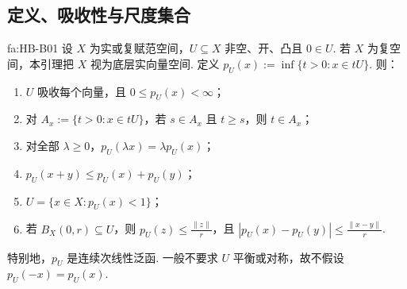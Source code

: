 \subsection{定义、吸收性与尺度集合}

\begin{FALemma}[B][Minkowski泛函支撑结果]{fa:HB-B01}
设 \(\displaystyle X\) 为实或复赋范空间，\(\displaystyle U\subseteq X\) 非空、开、凸且 \(\displaystyle0\in U\). 若 \(\displaystyle X\) 为复空间，本引理把 \(\displaystyle X\) 视为底层实向量空间. 定义 \(\displaystyle p_U(x) :=\inf\{t>0:x\in tU\}\).
则：
\begin{enumerate}[label=\textnormal{(\roman*)}]
\item \(\displaystyle U\) 吸收每个向量，且 \(\displaystyle0\leqslant p_U(x)<\infty\)；
\item 对 \(\displaystyle A_x:=\{t>0:x\in tU\}\)，若 \(\displaystyle s\in A_x\) 且 \(\displaystyle t\geqslant s\)，则 \(\displaystyle t\in A_x\)；
\item 对全部 \(\displaystyle \lambda\geqslant0\)，\(\displaystyle p_U(\lambda x)=\lambda p_U(x)\)；
\item \(\displaystyle p_U(x+y)\leqslant p_U(x)+p_U(y)\)；
\item \(\displaystyle U=\{x\in X:p_U(x)<1\}\)；
\item 若 \(\displaystyle B_X(0,r)\subseteq U\)，则 \(\displaystyle p_U(z)\leqslant\frac{\|z\|}{r}\)，且 \(\displaystyle |p_U(x)-p_U(y)|\leqslant\frac{\|x-y\|}{r}\).
\end{enumerate}
特别地，\(\displaystyle p_U\) 是连续次线性泛函. 一般不要求 \(\displaystyle U\) 平衡或对称，故不假设 \(\displaystyle p_U(-x)=p_U(x)\).
\end{FALemma}

